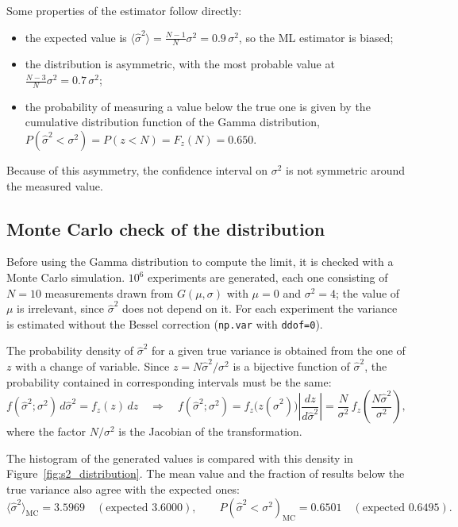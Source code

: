 \documentclass[11pt,a4paper]{article}
\begin{document}
	Some properties of the estimator follow directly:
	\begin{itemize}
		\item the expected value is $\langle \hat\sigma^2 \rangle = \frac{N-1}{N}\sigma^2 = 0.9\,\sigma^2$, so the ML estimator is biased;
		\item the distribution is asymmetric, with the most probable value at $\frac{N-3}{N}\sigma^2 = 0.7\,\sigma^2$;
		\item the probability of measuring a value below the true one is given by the cumulative distribution function of the Gamma distribution, $P(\hat\sigma^2 < \sigma^2) = P(z < N) = F_z(N) = 0.650$.
	\end{itemize}
	Because of this asymmetry, the confidence interval on $\sigma^2$ is not symmetric around the measured value.

	\subsection*{Monte Carlo check of the distribution}

	Before using the Gamma distribution to compute the limit, it is checked with a Monte Carlo simulation.
	$10^6$ experiments are generated, each one consisting of $N = 10$ measurements drawn from $G(\mu, \sigma)$ with $\mu = 0$ and $\sigma^2 = 4$; the value of $\mu$ is irrelevant, since $\hat\sigma^2$ does not depend on it.
	For each experiment the variance is estimated without the Bessel correction (\texttt{np.var} with \texttt{ddof=0}).

	The probability density of $\hat\sigma^2$ for a given true variance is obtained from the one of $z$ with a change of variable.
	Since $z = N\hat\sigma^2/\sigma^2$ is a bijective function of $\hat\sigma^2$, the probability contained in corresponding intervals must be the same:
	\begin{equation}
		f(\hat\sigma^2; \sigma^2)\, d\hat\sigma^2 = f_z(z)\, dz
		\quad\Rightarrow\quad
		f(\hat\sigma^2; \sigma^2) = f_z\big(z(\hat\sigma^2)\big) \left|\frac{dz}{d\hat\sigma^2}\right| = \frac{N}{\sigma^2}\, f_z\!\left(\frac{N \hat\sigma^2}{\sigma^2}\right),
	\end{equation}
	where the factor $N/\sigma^2$ is the Jacobian of the transformation.

	The histogram of the generated values is compared with this density in Figure~\ref{fig:s2_distribution}.
	The mean value and the fraction of results below the true variance also agree with the expected ones:
	\begin{equation}
		\langle \hat\sigma^2 \rangle_{\text{MC}} = 3.5969 \quad (\text{expected } 3.6000), \qquad
		P(\hat\sigma^2 < \sigma^2)_{\text{MC}} = 0.6501 \quad (\text{expected } 0.6495).
	\end{equation}
\end{document}
